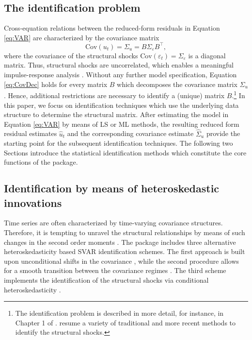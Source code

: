 \documentclass[nojss]{jss}\usepackage[]{graphicx}\usepackage[]{color}
\begin{document}
\subsection{The identification problem}

Cross-equation relations between the reduced-form residuals in Equation \ref{eq:VAR} are characterized by the covariance matrix
\begin{equation}\label{eq:CovDec}
\mbox{Cov}(u_t) = \Sigma_u = B\Sigma_\varepsilon B^\top,
\end{equation}
where the covariance of the structural shocks $\mbox{Cov}(\varepsilon_{t}) = \Sigma_\varepsilon$ is a diagonal matrix. Thus, structural shocks are uncorrelated, which enables a meaningful impulse-response analysis \citep{IntroductionMultipleTS}. Without any further model specification, Equation \ref{eq:CovDec} holds for every matrix $B$ which decomposes the covariance matrix $\Sigma_u$. Hence, additional restrictions are necessary to identify a (unique) matrix $B$.\footnote{The identification problem is described in more detail, for instance, in Chapter 1 of \cite{IntroductionMultipleTS}. \cite{LK17} resume a variety of traditional and more recent methods to identify the structural shocks.} In this paper, we focus on  identification techniques which use the underlying data structure to determine the structural matrix. %
After estimating the model in Equation \ref{eq:VAR} by means of LS or ML methods, the resulting reduced form residual estimates $\hat{u}_t$ and the corresponding covariance estimate $\widehat{\Sigma}_u$ provide the starting point for the subsequent identification techniques. The following two Sections introduce the statistical identification methods which constitute the core functions of the  package. \\


\subsection{Identification by means of heteroskedastic innovations}

Time series are often characterized by time-varying covariance structures. Therefore, it is tempting to unravel the structural relationships by means of such changes in the second order moments \citep[see, e.g.,][]{SF2001, Rigobon2003}. The  package includes three alternative heteroskedasticity based SVAR identification schemes. The first approach is built upon unconditional shifts in the covariance \citep{Rigobon2003}, while the second procedure allows for a smooth transition between the covariance regimes \citep{LUTKEPOHL201743}. The third scheme implements the identification of the structural shocks via conditional heteroskedasticity \citep{NP2004}.
\end{document}
